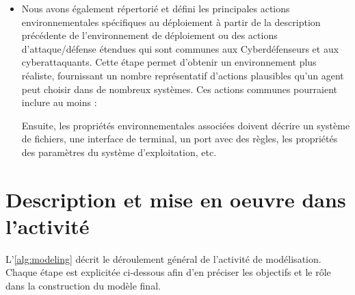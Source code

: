 \begin{itemize}
  \item Nous avons également répertorié et défini les principales actions environnementales spécifiques au déploiement à partir de la description précédente de l'environnement de déploiement ou des actions d'attaque/défense étendues qui sont communes aux Cyberdéfenseurs et aux cyberattaquants. Cette étape permet d'obtenir un environnement plus réaliste, fournissant un nombre représentatif d'actions plausibles qu'un agent peut choisir dans de nombreux systèmes.
        Ces actions communes pourraient inclure au moins :
        Ensuite, les propriétés environnementales associées doivent décrire un système de fichiers, une interface de terminal, un port avec des règles, les propriétés des paramètres du système d'exploitation, etc.
\end{itemize}

\section{Description et mise en oeuvre dans l'activité}

L'\autoref{alg:modeling} décrit le déroulement général de l'activité de modélisation.
Chaque étape est explicitée ci-dessous afin d'en préciser les objectifs et le rôle dans la construction du modèle final.

